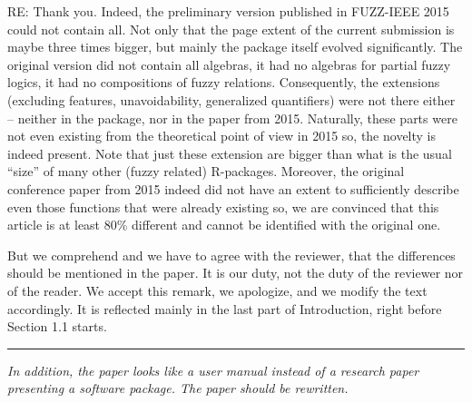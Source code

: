 \documentclass{article}
\newcommand{\separator}{\rule{\textwidth}{0.4pt}}
\begin{document}
{RE: Thank you. Indeed, the preliminary version published in FUZZ-IEEE 2015 could not contain all. Not only that the page extent of the current submission is maybe three times bigger, but mainly the package itself evolved significantly. The original version did not contain all algebras, it had no algebras for partial fuzzy logics, it had no compositions of fuzzy relations. Consequently, the extensions (excluding features, unavoidability, generalized quantifiers) were not there either -- neither in the package, nor in the paper from 2015. Naturally, these parts were not even existing from the theoretical point of view in 2015 so, the novelty is indeed present. Note that just these extension are bigger than what is the usual ``size'' of many other (fuzzy related) R-packages. Moreover, the original conference paper from 2015 indeed did not have an extent to sufficiently describe even those functions that were already existing so, we are convinced that this article is at least 80\% different and cannot be identified with the original one.  

But we comprehend and we have to agree with the reviewer, that the differences should be mentioned in the paper. It is our duty, not the duty of the reviewer nor of the reader. We accept this remark, we apologize, and we modify the text accordingly. It is reflected mainly in the last part of Introduction, right before Section 1.1 starts.}
\separator

{\it In addition, the paper looks like a user manual instead of a research paper presenting a software package. The paper should be rewritten. }
\end{document}
